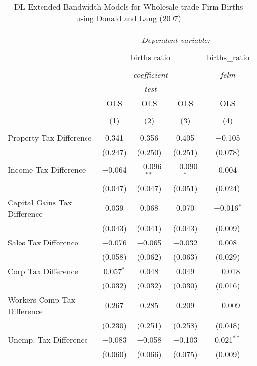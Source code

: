 
\begin{table}[!htbp] \centering 
  \caption{DL Extended Bandwidth Models for  Wholesale trade Firm Births using Donald and Lang (2007)} 
  \label{} 
\begin{tabular}{@{\extracolsep{5pt}}lcccc} 
\\[-1.8ex]\hline 
\hline \\[-1.8ex] 
 & \multicolumn{4}{c}{\textit{Dependent variable:}} \\ 
\cline{2-5} 
\\[-1.8ex] & \multicolumn{3}{c}{births ratio} & births\_ratio \\ 
\\[-1.8ex] & \multicolumn{3}{c}{\textit{coefficient}} & \textit{felm} \\ 
 & \multicolumn{3}{c}{\textit{test}} & \textit{} \\ 
 & OLS & OLS & OLS & OLS \\ 
\\[-1.8ex] & (1) & (2) & (3) & (4)\\ 
\hline \\[-1.8ex] 
 Property Tax Difference & 0.341 & 0.356 & 0.405 & $-$0.105 \\ 
  & (0.247) & (0.250) & (0.251) & (0.078) \\ 
  Income Tax Difference & $-$0.064 & $-$0.096$^{**}$ & $-$0.090$^{*}$ & 0.004 \\ 
  & (0.047) & (0.047) & (0.051) & (0.024) \\ 
  Capital Gains Tax Difference & 0.039 & 0.068 & 0.070 & $-$0.016$^{*}$ \\ 
  & (0.043) & (0.041) & (0.043) & (0.009) \\ 
  Sales Tax Difference & $-$0.076 & $-$0.065 & $-$0.032 & 0.008 \\ 
  & (0.058) & (0.062) & (0.063) & (0.029) \\ 
  Corp Tax Difference & 0.057$^{*}$ & 0.048 & 0.049 & $-$0.018 \\ 
  & (0.032) & (0.032) & (0.030) & (0.016) \\ 
  Workers Comp Tax Difference & 0.267 & 0.285 & 0.209 & $-$0.009 \\ 
  & (0.230) & (0.251) & (0.258) & (0.048) \\ 
  Unemp. Tax Difference & $-$0.083 & $-$0.058 & $-$0.103 & 0.021$^{**}$ \\ 
  & (0.060) & (0.066) & (0.075) & (0.009) \\ 

\end{tabular}
\end{table}
